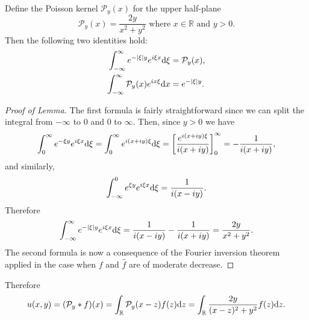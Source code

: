 \begin{sol}
  \begin{lem}
    Define the Poisson kernel $\mathcal{P}_y(x)$ for the upper half-plane
    \begin{displaymath}
      \mathcal{P}_y(x) = \frac{2y}{x^2+y^2}
      \text{ where } x\in\mathbb{R} \text{ and } y>0.
    \end{displaymath}
    Then the following two identities hold:
    \begin{align*}
      \int_{-\infty}^{\infty}e^{-|\xi|y}e^{i\xi x}\mathrm{d}\xi &= \mathcal{P}_y(x), \\
      \int_{-\infty}^{\infty}\mathcal{P}_y(x)e^{ix\xi}\mathrm{d} x &=
                                                                     e^{-|\xi|y}.
    \end{align*}
  \end{lem}
  \begin{proof}[Proof of Lemma]
    The first formula is fairly straightforward since we can split
    the integral from $-\infty$ to $0$ and $0$ to $\infty$.
    Then, since $y>0$ we have
    \begin{displaymath}
      \int_0^{\infty}e^{-\xi y}e^{i\xi x}\mathrm{d} \xi =
      \int_0^{\infty}e^{i(x+iy)\xi}\mathrm{d} \xi =
      \left[\frac{e^{i(x+iy)\xi}}{i(x+iy)}\right]_0^{\infty} =
      -\frac{1}{i(x+iy)},
    \end{displaymath}
    and similarly,
    \begin{displaymath}
      \int_{-\infty}^0e^{\xi y}e^{i\xi x}\mathrm{d} \xi = \frac{1}{i(x-iy)}.
    \end{displaymath}
    Therefore
    \begin{displaymath}
      \int_{-\infty}^{\infty}e^{-|\xi|y}e^{i\xi x}\mathrm{d} \xi
      = \frac{1}{i(x-iy)} - \frac{1}{i(x+iy)}
      = \frac{2y}{x^2+y^2}.
    \end{displaymath}
    The second formula is now a consequence of the Fourier
    inversion theorem applied in the case when
    $f$ and $\hat{f}$ are of moderate decrease.
  \end{proof}
  Therefore
  \begin{displaymath}
    u(x, y) = (\mathcal{P}_y*f)(x) =
    \int_{\mathbb{R}}\mathcal{P}_y(x-z)f(z)\mathrm{d} z
    = \int_{\mathbb{R}}\frac{2y}{(x-z)^2+y^2}f(z)\mathrm{d} z.
  \end{displaymath}
\end{sol}

